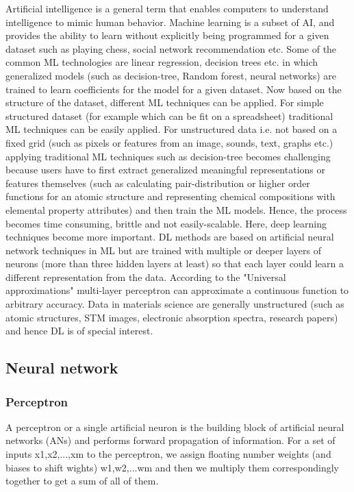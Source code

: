 \documentclass[pdflatex,sn-mathphys]{sn-jnl}%
\theoremstyle{thmstyleone}%
\theoremstyle{thmstyletwo}%
\theoremstyle{thmstylethree}%
\begin{document}
Artificial intelligence \cite{friedman2001elements} is a general term that enables computers to understand intelligence to mimic human behavior. Machine learning is a subset of AI, and provides the ability to learn without explicitly being programmed for a given dataset such as playing chess, social network recommendation etc. Some of the common ML technologies are linear regression, decision trees etc. in which generalized models (such as decision-tree, Random forest, neural networks) are trained to learn coefficients for the model for a given dataset. Now based on the structure of the dataset, different ML techniques can be applied. For simple structured dataset (for example which can be fit on a spreadsheet) traditional ML techniques can be easily applied. For unstructured data i.e. not based on a fixed grid (such as pixels or features from an image, sounds, text, graphs etc.) applying traditional ML techniques such as decision-tree becomes challenging because users have to first extract generalized meaningful representations or features themselves (such as calculating pair-distribution or higher order functions for an atomic structure and representing chemical compositions with elemental property attributes) and then train the ML models. Hence, the process becomes time consuming, brittle and not easily-scalable. Here, deep learning techniques become more important. DL methods are based on artificial neural network techniques in ML but are trained with multiple or deeper layers of neurons (more than three hidden layers at least) so that each layer could learn a different representation from the data. According to the "Universal approximations" \cite{kidger2020universal} multi-layer perceptron can approximate a continuous function to arbitrary accuracy. Data in materials science are generally unstructured (such as atomic structures, STM images, electronic absorption spectra, research papers) and hence DL is of special interest. 


\subsection{Neural network}\label{sec:neural-nets}

\subsubsection{Perceptron}

A perceptron or a single artificial neuron \cite{minsky2017perceptrons} is the building block of artificial neural networks (ANs) and performs forward propagation of information. For a set of inputs x1,x2,...,xm to the perceptron, we assign floating number weights (and biases to shift wights) w1,w2,...wm and then we multiply them correspondingly together to get a sum of all of them. 
\end{document}

